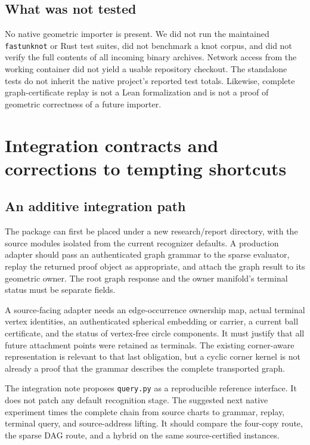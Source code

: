 \documentclass[11pt,a4paper]{article}
\theoremstyle{definition}
\theoremstyle{remark}
\newcommand{\code}[1]{\nolinkurl{#1}}
\begin{document}
\subsection{What was not tested}
No native geometric importer is present. We did not run the maintained \code{fastunknot} or Rust test suites, did not benchmark a knot corpus, and did not verify the full contents of all incoming binary archives. Network access from the working container did not yield a usable repository checkout. The standalone tests do not inherit the native project's reported test totals. Likewise, complete graph-certificate replay is not a Lean formalization and is not a proof of geometric correctness of a future importer.

\section{Integration contracts and corrections to tempting shortcuts}
\label{sec:integration}
\subsection{An additive integration path}
The package can first be placed under a new research/report directory, with the source modules isolated from the current recognizer defaults. A production adapter should pass an authenticated graph grammar to the sparse evaluator, replay the returned proof object as appropriate, and attach the graph result to its geometric owner. The root graph response and the owner manifold's terminal status must be separate fields.

A source-facing adapter needs an edge-occurrence ownership map, actual terminal vertex identities, an authenticated spherical embedding or carrier, a current ball certificate, and the status of vertex-free circle components. It must justify that all future attachment points were retained as terminals. The existing corner-aware representation is relevant to that last obligation, but a cyclic corner kernel is not already a proof that the grammar describes the complete transported graph.

The integration note proposes \code{query.py} as a reproducible reference interface. It does not patch any default recognition stage. The suggested next native experiment times the complete chain from source charts to grammar, replay, terminal query, and source-address lifting. It should compare the four-copy route, the sparse DAG route, and a hybrid on the same source-certified instances.
\end{document}
